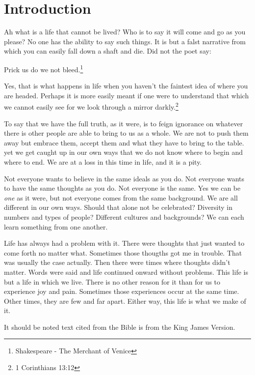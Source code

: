 \chapter{Introduction}

Ah what is a life that cannot be lived? Who is to say it will come and go as you
please? No one has the ability to say such things. It is but a falst narrative
from which you can easily fall down a shaft and die. Did not the poet say:

\begin{displayquote}
Prick us do we not bleed.\footnote{Shakespeare - The Merchant of Venice}
\end{displayquote}

Yes, that is what happens in life when you haven't the faintest idea of where
you are headed. Perhaps it is more easily meant if one were to understand that
which we cannot easily see for we look through a mirror 
darkly.\footnote{1 Corinthians 13:12}

To say that we have the full truth, as it were, is to feign ignorance on 
whatever there is other people are able to bring to us as a whole. We are not to 
push them away but embrace them, accept them and what they have to bring to the
table. yet we get caught up in our own ways that we do not know where to begin
and where to end. We are at a loss in this time in life, and it is a pity.

Not everyone wants to believe in the same ideals as you do. Not everyone wants
to have the same thoughts as you do. Not everyone is the same. Yes we can be 
\textit{one} as it were, but not everyone comes from the same background. We 
are all different in our own ways. Should that alone not be celebrated?
Diversity in numbers and types of people? Different cultures and backgrounds? We
can each learn something from one another.

Life has always had a problem with it. There were thoughts that just wanted to
come forth no matter what. Sometimes those thougths got me in trouble. That was
usually the case actually. Then there were times where thoughts didn't matter.
Words were said and life continued onward without problems. This life is but a
life in which we live. There is no other reason for it than for us to experience
joy and pain. Sometimes those experiences occur at the same time. Other times,
they are few and far apart. Either way, this life is what we make of it.

It should be noted text cited from the Bible is from the King James Version.
